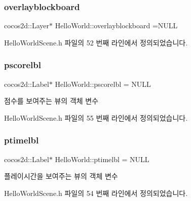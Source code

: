 \subsubsection{\texorpdfstring{overlayblockboard}{overlayblockboard}}
{\footnotesize\ttfamily cocos2d\+::\+Layer$\ast$ Hello\+World\+::overlayblockboard =N\+U\+LL\hspace{0.3cm}{\ttfamily [protected]}}



Hello\+World\+Scene.\+h 파일의 52 번째 라인에서 정의되었습니다.

\mbox{\label{class_hello_world_a7ed25294d2c42aec8b7b8f37bbf75a38}} 
\subsubsection{\texorpdfstring{pscorelbl}{pscorelbl}}
{\footnotesize\ttfamily cocos2d\+::\+Label$\ast$ Hello\+World\+::pscorelbl = N\+U\+LL\hspace{0.3cm}{\ttfamily [protected]}}



점수를 보여주는 뷰의 객체 변수 



Hello\+World\+Scene.\+h 파일의 55 번째 라인에서 정의되었습니다.

\mbox{\label{class_hello_world_ae0520bbadc78c24a50ddeb3f839b4012}} 
\subsubsection{\texorpdfstring{ptimelbl}{ptimelbl}}
{\footnotesize\ttfamily cocos2d\+::\+Label$\ast$ Hello\+World\+::ptimelbl = N\+U\+LL\hspace{0.3cm}{\ttfamily [protected]}}



플레이시간을 보여주는 뷰의 객체 변수 



Hello\+World\+Scene.\+h 파일의 54 번째 라인에서 정의되었습니다.

\mbox{\label{class_hello_world_a52aca4f2a78e6413ace505d313b006fc}} 
